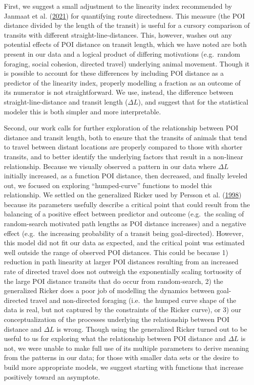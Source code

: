 \documentclass[twoside,12pt,final]{ucthesis-CA2012}
\begin{document}
\begin{ucmainmatter}
First, we suggest a small adjustment to the linearity index recommended by Janmaat et al. (\protect\hyperlink{ref-janmaat2021}{2021}) for quantifying route directedness. This measure (the POI distance divided by the length of the transit) is useful for a cursory comparison of transits with different straight-line-distances. This, however, washes out any potential effects of POI distance on transit length, which we have noted are both present in our data and a logical product of differing motivations (e.g.~random foraging, social cohesion, directed travel) underlying animal movement. Though it is possible to account for these differences by including POI distance as a predictor of the linearity index, properly modelling a fraction as an outcome of its numerator is not straightforward. We use, instead, the difference between straight-line-distance and transit length (\(\Delta L\)), and suggest that for the statistical modeler this is both simpler and more interpretable.

Second, our work calls for further exploration of the relationship between POI distance and transit length, both to ensure that the transits of animals that tend to travel between distant locations are properly compared to those with shorter transits, and to better identify the underlying factors that result in a non-linear relationship. Because we visually observed a pattern in our data where \(\Delta L\) initially increased, as a function POI distance, then decreased, and finally leveled out, we focused on exploring ``humped-curve'' functions to model this relationship. We settled on the generalized Ricker used by Persson et al. (\protect\hyperlink{ref-persson1998}{1998}) because its parameters usefully describe a critical point that could result from the balancing of a positive effect between predictor and outcome (e.g.~the scaling of random-search motivated path lengths as POI distance increases) and a negative effect (e.g.~the increasing probability of a transit being goal-directed). However, this model did not fit our data as expected, and the critical point was estimated well outside the range of observed POI distances. This could be because 1) reduction in path linearity at larger POI distances resulting from an increased rate of directed travel does not outweigh the exponentially scaling tortuosity of the large POI distance transits that do occur from random-search, 2) the generalized Ricker does a poor job of modelling the dynamics between goal-directed travel and non-directed foraging (i.e.~the humped curve shape of the data is real, but not captured by the constraints of the Ricker curve), or 3) our conceptualization of the processes underlying the relationship between POI distance and \(\Delta L\) is wrong. Though using the generalized Ricker turned out to be useful to us for exploring what the relationship between POI distance and \(\Delta L\) is not, we were unable to make full use of its multiple parameters to derive meaning from the patterns in our data; for those with smaller data sets or the desire to build more appropriate models, we suggest starting with functions that increase positively toward an asymptote.


\end{ucmainmatter}
\end{document}
